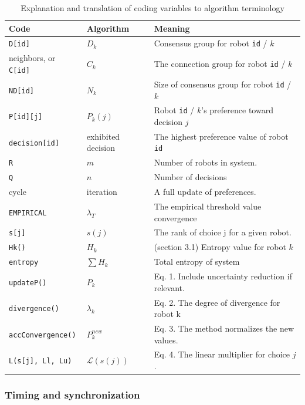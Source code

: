 \begin{table}
\begin{center}
\begin{tabular}{ lll } 
\hline
Code & Algorithm & Meaning \\
\hline
\texttt{D[id]} & $D_k$ & Consensus group for robot \texttt{id} / $k$\\ 
neighbors, or \texttt{C[id]} & $C_k$ & The connection group for robot \texttt{id} / $k$\\ 
\texttt{ND[id]} & $N_k$ & Size of consensus group for robot \texttt{id} / $k$\\ 
\texttt{P[id][j]} & $P_k(j)$ & Robot \texttt{id} / $k$'s preference toward decision $j$ \\
\texttt{decision[id]} & exhibited decision & The highest preference value of robot \texttt{id} \\
\texttt{R} & $m$ & Number of robots in system. \\
\texttt{Q} & $n$ & Number of decisions \\
cycle & iteration & A full update of preferences. \\
\texttt{EMPIRICAL} & $\lambda_T$ & The empirical threshold value convergence\\
\texttt{s[j]} & $s(j)$ & The rank of choice j for a given robot.\\
\texttt{Hk()} & $H_k$ & (section 3.1) Entropy value for robot $k$\\
\texttt{entropy} & $\sum H_k $ & Total entropy of system\\
\texttt{updateP()} & $P_k$ & Eq. 1. Include uncertainty reduction if relevant. \\
\texttt{divergence()} & $\lambda_k$ & Eq. 2. The degree of divergence for robot k\\
\texttt{accConvergence()} & $P^{new}_k$ & Eq. 3. The method normalizes the new values.\\
\texttt{L(s[j], Ll, Lu)} & $\mathscr{L}(s(j))$ & Eq. 4. The linear multiplier for choice $j$.\\
\hline
\end{tabular}
\caption{Explanation and translation of coding variables to algorithm terminology}
\label{tab:gloss}
\end{center}
\end{table}

\subsubsection{Timing and synchronization}

